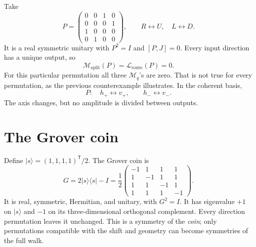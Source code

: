 \documentclass[11pt,a4paper,oneside]{report}
\newcommand{\ket}[1]{\lvert #1\rangle}
\newcommand{\bra}[1]{\langle #1\rvert}
\newcommand{\Id}{I}
\numberwithin{equation}{chapter}
\begin{document}
Take
\begin{equation}
\boxed{
P=\begin{pmatrix}
0&0&1&0\\0&0&0&1\\1&0&0&0\\0&1&0&0
\end{pmatrix},
\qquad R\leftrightarrow U,\quad L\leftrightarrow D.
}
\end{equation}
It is a real symmetric unitary with \(P^2=\Id\) and \([P,J]=0\).
Every input direction has a unique output, so
\begin{equation}
\mathcal M_{\mathrm{split}}(P)=\mathcal L_{\mathrm{route}}(P)=0.
\end{equation}
For this particular permutation all three \(\mathcal M_q\)'s are
zero. That is not true for every permutation, as the previous
counterexample illustrates. In the coherent basis,
\begin{equation}
P:\quad h_+\leftrightarrow v_+,\qquad h_-\leftrightarrow v_-.
\end{equation}
The axis changes, but no amplitude is divided between outputs.

\section{The Grover coin}

Define \(\ket{s}=(1,1,1,1)^{\mathsf T}/2\). The Grover coin is
\begin{equation}
\boxed{
G=2\ket{s}\bra{s}-\Id
=\frac12\begin{pmatrix}
-1&1&1&1\\1&-1&1&1\\1&1&-1&1\\1&1&1&-1
\end{pmatrix}.
}
\end{equation}
It is real, symmetric, Hermitian, and unitary, with \(G^2=\Id\).
It has eigenvalue \(+1\) on \(\ket{s}\) and \(-1\) on its
three-dimensional orthogonal complement. Every direction permutation
leaves it unchanged. This is a symmetry of the \emph{coin}; only
permutations compatible with the shift and geometry can become
symmetries of the full walk.
\end{document}
